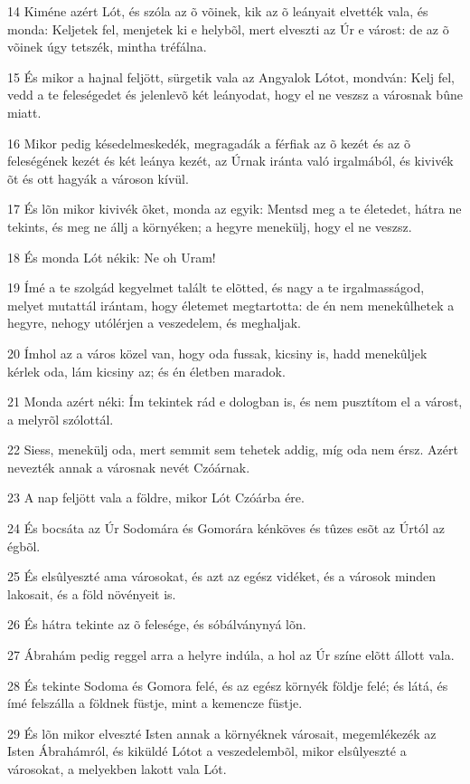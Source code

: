 \par 14 Kiméne azért Lót, és szóla az õ võinek, kik az õ leányait elvették vala, és monda: Keljetek fel, menjetek ki e helybõl, mert elveszti az Úr e várost: de az õ võinek úgy tetszék, mintha tréfálna.
\par 15 És mikor a hajnal feljött, sürgetik vala az Angyalok Lótot, mondván: Kelj fel, vedd a te feleségedet és jelenlevõ két leányodat, hogy el ne veszsz a városnak bûne miatt.
\par 16 Mikor pedig késedelmeskedék, megragadák a férfiak az õ kezét és az õ feleségének kezét és két leánya kezét, az Úrnak iránta való irgalmából, és kivivék õt és ott hagyák a városon kívül.
\par 17 És lõn mikor kivivék õket, monda az egyik: Mentsd meg a te életedet, hátra ne tekints, és meg ne állj a környéken; a hegyre menekülj, hogy el ne veszsz.
\par 18 És monda Lót nékik: Ne oh Uram!
\par 19 Ímé a te szolgád kegyelmet talált te elõtted, és nagy a te irgalmasságod, melyet mutattál irántam, hogy életemet megtartotta: de én nem menekûlhetek a hegyre, nehogy utólérjen a veszedelem, és meghaljak.
\par 20 Ímhol az a város közel van, hogy oda fussak, kicsiny is, hadd menekûljek kérlek oda, lám kicsiny az; és én életben maradok.
\par 21 Monda azért néki: Ím tekintek rád e dologban is, és nem pusztítom el a várost, a melyrõl szólottál.
\par 22 Siess, menekülj oda, mert semmit sem tehetek addig, míg oda nem érsz. Azért nevezték annak a városnak nevét Czóárnak.
\par 23 A nap feljött vala a földre, mikor Lót Czóárba ére.
\par 24 És bocsáta az Úr Sodomára és Gomorára kénköves és tûzes esõt az Úrtól az égbõl.
\par 25 És elsûlyeszté ama városokat, és azt az egész vidéket, és a városok minden lakosait, és a föld növényeit is.
\par 26 És hátra tekinte az õ felesége, és sóbálványnyá lõn.
\par 27 Ábrahám pedig reggel arra a helyre indúla, a hol az Úr színe elõtt állott vala.
\par 28 És tekinte Sodoma és Gomora felé, és az egész környék földje felé; és látá, és ímé felszálla a földnek füstje, mint a kemencze füstje.
\par 29 És lõn mikor elveszté Isten annak a környéknek városait, megemlékezék az Isten Ábrahámról, és kiküldé Lótot a veszedelembõl, mikor elsûlyeszté a városokat, a melyekben lakott vala Lót.
